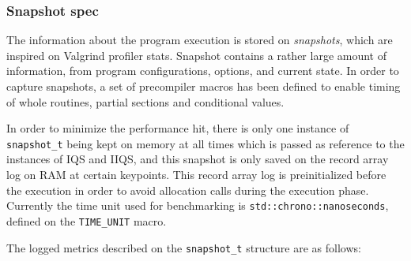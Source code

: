 \subsubsection{Snapshot spec}
The information about the program execution is stored on \textit{snapshots}, which are inspired on Valgrind profiler stats. Snapshot contains a rather large amount of information, from program configurations, options, and current state. In order to capture snapshots, a set of precompiler macros has been defined to enable timing of whole routines, partial sections and conditional values. 

In order to minimize the performance hit, there is only one instance of \texttt{snapshot\_t} being kept on memory at all times which is passed as reference to the instances of IQS and IIQS, and this snapshot is only saved on the record array log on RAM at certain keypoints. This record array log is preinitialized before the execution in order to avoid allocation calls during the execution phase. Currently the time unit used for benchmarking is \texttt{std::chrono::nanoseconds}, defined on the \texttt{TIME\_UNIT} macro.

The logged metrics described on the \texttt{snapshot\_t} structure are as follows:

